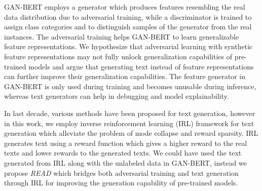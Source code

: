 \documentclass[11pt]{article}
\begin{document}

GAN-BERT employs a generator which produces features resembling the real data distribution due to adversarial training, while a discriminator is trained to assign class categories and to distinguish samples of the generator from the real instances. The adversarial training helps GAN-BERT to learn generalizable feature representations. We hypothesize that adversarial learning with synthetic feature representations may not fully unlock generalization capabilities of pre-trained models and argue that generating text instead of feature representations can further improve their generalization capabilities. The feature generator in GAN-BERT is only used during training and becomes unusable during inference, whereas text generators can help in debugging and model explainability. 


In last decade, various methods \cite{wiseman2016sequence, dong2019unified, song2019mass, lewis2020bart} have been proposed for text generation, however in this work, we employ inverse reinforcement learning (IRL) \cite{ijcai2018-0606} framework for text generation which alleviate the problem of mode collapse and reward sparsity. IRL generates text using a reward function which gives a higher reward to the real texts and lower rewards to the generated texts. We could have used the text generated from IRL along with the unlabeled data in GAN-BERT, instead we propose \textit{READ} which bridges both adversarial training and text generation through IRL for improving the generation capability of pre-trained models. 
\end{document}
